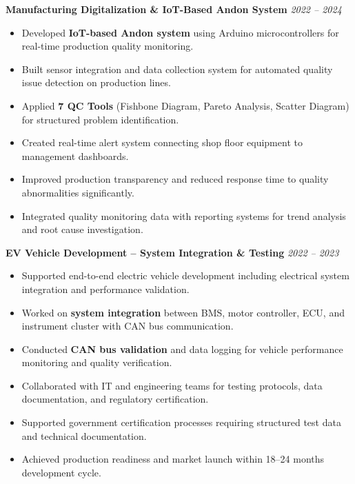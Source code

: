 \documentclass[a4paper,10pt]{article}
\begin{document}
\vspace{6pt}

\textbf{Manufacturing Digitalization \& IoT-Based Andon System} \hfill \textit{2022 – 2024}
\begin{itemize}
    \item Developed \textbf{IoT-based Andon system} using Arduino microcontrollers for real-time production quality monitoring.
    \item Built sensor integration and data collection system for automated quality issue detection on production lines.
    \item Applied \textbf{7 QC Tools} (Fishbone Diagram, Pareto Analysis, Scatter Diagram) for structured problem identification.
    \item Created real-time alert system connecting shop floor equipment to management dashboards.
    \item Improved production transparency and reduced response time to quality abnormalities significantly.
    \item Integrated quality monitoring data with reporting systems for trend analysis and root cause investigation.
\end{itemize}

\vspace{6pt}

\textbf{EV Vehicle Development – System Integration \& Testing} \hfill \textit{2022 – 2023}
\begin{itemize}
    \item Supported end-to-end electric vehicle development including electrical system integration and performance validation.
    \item Worked on \textbf{system integration} between BMS, motor controller, ECU, and instrument cluster with CAN bus communication.
    \item Conducted \textbf{CAN bus validation} and data logging for vehicle performance monitoring and quality verification.
    \item Collaborated with IT and engineering teams for testing protocols, data documentation, and regulatory certification.
    \item Supported government certification processes requiring structured test data and technical documentation.
    \item Achieved production readiness and market launch within 18–24 months development cycle.
\end{itemize}

\vspace{6pt}
\end{document}
